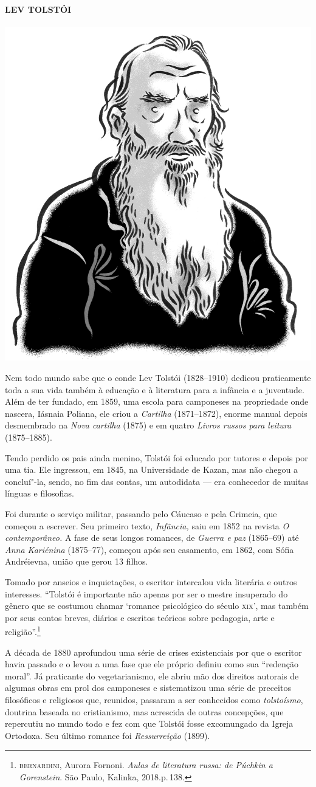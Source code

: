 \paragraph{LEV TOLSTÓI}

\noindent\includegraphics[width=.8in]{./imgs/autor4.jpg}

\noindent{}Nem todo mundo sabe que o conde Lev Tolstói (1828--1910) dedicou
praticamente toda a sua vida também à educação e à literatura para a
infância e a juventude. Além de ter fundado, em 1859, uma escola para
camponeses na propriedade onde nascera, Iásnaia Poliana, ele criou a
\emph{Cartilha} (1871--1872), enorme manual depois desmembrado na
\emph{Nova cartilha} (1875) e em quatro \emph{Livros russos para
leitura} (1875--1885).

Tendo perdido os pais ainda menino, Tolstói foi educado por tutores e
depois por uma tia. Ele ingressou, em 1845, na Universidade de Kazan,
mas não chegou a concluí"-la, sendo, no fim das contas, um autodidata ---
era conhecedor de muitas línguas e filosofias.

Foi durante o serviço militar, passando pelo Cáucaso e pela Crimeia, que
começou a escrever. Seu primeiro texto, \emph{Infância,} saiu em 1852 na
revista \emph{O contemporâneo.} A fase de seus longos romances, de
\emph{Guerra e paz} (1865--69) até \emph{Anna Kariénina} (1875--77),
começou após seu casamento, em 1862, com Sófia Andréievna, união que
gerou 13 filhos.

Tomado por anseios e inquietações, o escritor intercalou vida literária
e outros interesses. ``Tolstói é importante não apenas por ser o mestre
insuperado do gênero que se costumou chamar `romance psicológico do
século \textsc{xix}', mas também por seus contos breves, diários e escritos
teóricos sobre pedagogia, arte e religião''.\footnote{\scriptsize\textsc{bernardini}, Aurora Fornoni. \textit{Aulas de literatura russa: de Púchkin a Gorenstein}. São Paulo, Kalinka, 2018.p.\,138.}

A década de 1880 aprofundou uma série de crises existenciais por que o
escritor havia passado e o levou a uma fase que ele próprio definiu como
sua ``redenção moral''. Já praticante do vegetarianismo, ele abriu mão
dos direitos autorais de algumas obras em prol dos camponeses e
sistematizou uma série de preceitos filosóficos e religiosos que,
reunidos, passaram a ser conhecidos como \emph{tolstoísmo}, doutrina
baseada no cristianismo, mas acrescida de outras concepções, que
repercutiu no mundo todo e fez com que Tolstói fosse excomungado da
Igreja Ortodoxa. Seu último romance foi \emph{Ressurreição} (1899).

